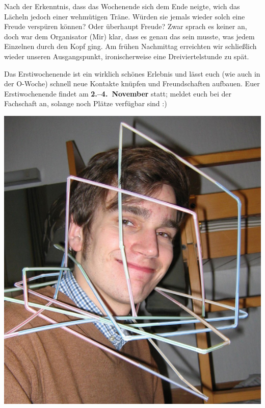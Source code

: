 \begin{multicols*}{2}
Nach der Erkenntnis, dass das Wochenende sich dem Ende neigte, wich das Lächeln jedoch einer wehmütigen Träne.
Würden sie jemals wieder solch eine Freude verspüren können?
Oder überhaupt Freude?
Zwar sprach es keiner an, doch war dem Organisator (Mir) klar, dass es genau das sein musste, was jedem Einzelnen durch den Kopf ging.
Am frühen Nachmittag erreichten wir schließlich wieder unseren Ausgangspunkt, ironischerweise eine Dreiviertelstunde zu spät. 

Das Erstiwochenende ist ein wirklich schönes Erlebnis und lässt euch (wie auch in der O-Woche) schnell neue Kontakte knüpfen und Freundschaften aufbauen.
Euer Erstiwochenende findet am \textbf{2.--4.~November} statt; meldet euch bei der Fachschaft an, solange noch Plätze verfügbar sind :)


\begin{center}
	\includegraphics[width=\columnwidth, height=0.3\textheight]{res/erstiwe/strohhalme.png}
\end{center}
\end{multicols*}

